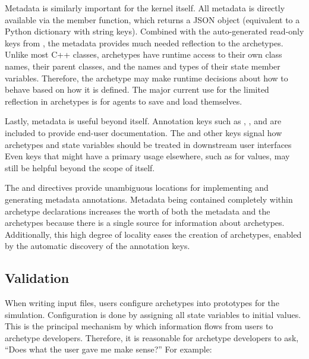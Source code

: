Metadata is similarly important for the \cyclus kernel itself. All metadata is 
directly available via the  member function, which returns 
a \gls{JSON} 
object (equivalent to a Python dictionary with string keys). Combined with the 
auto-generated read-only keys from \cycpp, the metadata provides much needed 
reflection to the archetypes.  Unlike most C++ classes, archetypes have 
runtime access to their own class names, their parent classes, and the names and 
types of their state member variables. Therefore, the archetype may 
make runtime decisions about how to behave based on how it is defined.
The major current use for the limited reflection in archetypes is for agents to 
save and load themselves. 

Lastly, metadata is useful beyond \cyclus itself. Annotation keys such as ,
, and  are included to provide end-user documentation. 
The 
and other keys signal how archetypes and state variables should be treated in 
downstream user interfaces 
Even keys that might have a primary usage elsewhere, 
such as for  values, may still be helpful beyond the scope of \cyclus 
itself.  

The  and  directives provide 
unambiguous locations for implementing and 
generating metadata annotations. Metadata being contained completely within archetype 
declarations increases the worth of both the metadata and the archetypes
because there is a single source for information about archetypes.
Additionally, this high degree of locality eases the creation of
archetypes, enabled by the automatic discovery of the annotation keys.

\subsection{Validation}

When writing \cyclus input files, users configure archetypes into prototypes 
for the simulation.  Configuration is done by assigning all state variables to 
  initial values. This is the principal mechanism by which information flows 
  from users to archetype developers. Therefore, it is reasonable for archetype 
  developers to ask, ``Does what the user gave me make sense?'' For example: 


